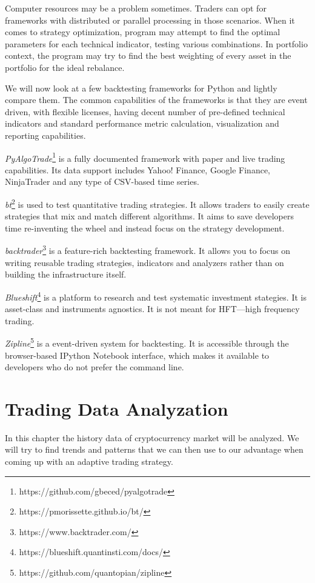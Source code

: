 Computer resources may be a problem sometimes. Traders can opt for frameworks with distributed or parallel processing in those scenarios. When it comes to strategy optimization, program may attempt to find the optimal parameters for each technical indicator, testing various combinations. In portfolio context, the program may try to find the best weighting of every asset in the portfolio for the ideal rebalance.

We will now look at a few backtesting frameworks for Python and lightly compare them. The common capabilities of the frameworks is that they are event driven, with flexible licenses, having decent number of pre-defined technical indicators and standard performance metric calculation, visualization and reporting capabilities.

\emph{PyAlgoTrade}\footnote{https://github.com/gbeced/pyalgotrade} is a fully documented framework with paper and live trading capabilities. Its data support includes Yahoo! Finance, Google Finance, NinjaTrader and any type of CSV-based time series.

\emph{bt}\footnote{https://pmorissette.github.io/bt/} is used to test quantitative trading strategies. It allows traders to easily create strategies that mix and match different algorithms. It aims to save developers time re-inventing the wheel and instead focus on the strategy development.

\emph{backtrader}\footnote{https://www.backtrader.com/} is a feature-rich backtesting framework. It allows you to focus on writing reusable trading strategies, indicators and analyzers rather than on building the infrastructure itself.

\emph{Blueshift}\footnote{https://blueshift.quantinsti.com/docs/} is a platform to research and test systematic investment stategies. It is asset-class and instruments agnostics. It is not meant for HFT---high frequency trading.

\emph{Zipline}\footnote{https://github.com/quantopian/zipline} is a event-driven system for backtesting. It is accessible through the browser-based IPython Notebook interface, which makes it available to developers who do not prefer the command line.


\chapter{Trading Data Analyzation}
\label{data-analyzation}

In this chapter the history data of cryptocurrency market will be analyzed. We will try to find trends and patterns that we can then use to our advantage when coming up with an adaptive trading strategy.

